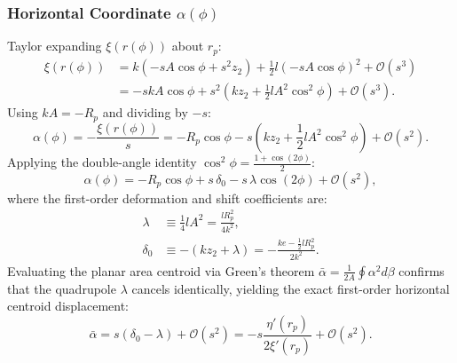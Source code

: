 \subsubsection{Horizontal Coordinate $\alpha(\phi)$}
Taylor expanding $\xi(r(\phi))$ about $r_p$:
\begin{align}
    \xi(r(\phi)) &= k\left(-s A \cos\phi + s^2 z_2\right) + \frac{1}{2}l\left(-s A \cos\phi\right)^2 + \mathcal{O}(s^3) \nonumber \\
    &= -s k A \cos\phi + s^2 \left( k z_2 + \frac{1}{2} l A^2 \cos^2\phi \right) + \mathcal{O}(s^3).
\end{align}
Using $k A = -R_p$ and dividing by $-s$:
\begin{equation}
    \alpha(\phi) = -\frac{\xi(r(\phi))}{s} = -R_p\cos\phi - s\left( k z_2 + \frac{1}{2} l A^2 \cos^2\phi \right) + \mathcal{O}(s^2).
\end{equation}
Applying the double-angle identity $\cos^2\phi = \frac{1 + \cos(2\phi)}{2}$:
\begin{equation}
    \boxed{\alpha(\phi) = -R_p\cos\phi + s\,\delta_0 - s\,\lambda\cos(2\phi) + \mathcal{O}(s^2)},
    \label{eq:alpha_asymptotic_expansion}
\end{equation}
where the first-order deformation and shift coefficients are:
\begin{align}
    \lambda &\equiv \frac{1}{4} l A^2 = \frac{l R_p^2}{4k^2}, \label{eq:def_lambda} \\
    \delta_0 &\equiv -\left(k z_2 + \lambda\right) = -\frac{k e - \frac{1}{2} l R_p^2}{2k^2}. \label{eq:def_delta0}
\end{align}
Evaluating the planar area centroid via Green's theorem $\bar{\alpha} = \frac{1}{2A}\oint \alpha^2 d\beta$ confirms that the quadrupole $\lambda$ cancels identically, yielding the exact first-order horizontal centroid displacement:
\begin{equation}
    \boxed{\bar{\alpha} = s\left(\delta_0 - \lambda\right) + \mathcal{O}(s^2) = -s\frac{\eta'(r_p)}{2\xi'(r_p)} + \mathcal{O}(s^2)}.
    \label{eq:near_polar_centroid_shift}
\end{equation}

